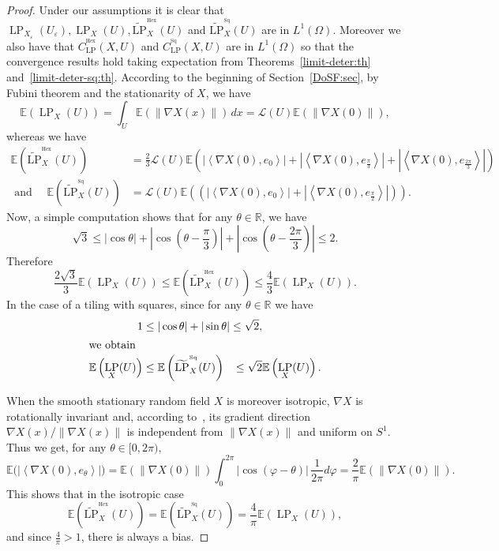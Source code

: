 \documentclass[10pt]{amsart}
\theoremstyle{definition}\newtheorem{defi}[theo]{Definition}\newtheorem{rema}[theo]{Remark}\newtheorem{exam}[theo]{Example}\newtheorem{exem}[theo]{Example}\newtheorem{nota}[theo]{Notation}
\newcommand{\R}{\mathbb{R}}
\newcommand{\E}{\mathbb{E}}
\newcommand{\eps}{\varepsilon}
\DeclareMathOperator{\LP}{LP}
\DeclareMathOperator{\Hex}{Hex}
\DeclareMathOperator{\Sq}{Sq}
\newcommand{\tLP}{\widetilde{\mathrm{LP}}}
\newcommand{\calL}{\mathcal{L}}
\begin{document}
\begin{proof}
Under our assumptions it is clear that $\LP_{X_\eps}(U_\eps), \LP_X(U), \tLP^{^{\Hex}}_{X}(U)$ and $\tLP^{^{\Sq}}_{X}(U)$ are in $L^1(\Omega)$. Moreover we also have that $C_{\LP}^{^{\Hex}}(X,U)$ and $C_{\LP}^{^{\Sq}}(X,U)$ are in $L^1(\Omega)$ so that the convergence results hold taking expectation from Theorems~\ref{limit-deter:th} and~\ref{limit-deter-sq:th}. According to the beginning of Section~\ref{DoSF:sec}, by Fubini theorem and the stationarity of $X$, we have
\[
\E\left(\LP_{X}(U)\right) = \int_U \E \left(\left\|\nabla X(x)\right\|\right) \, dx = \calL(U)
\E \left(\left\|\nabla X(0)\right\|\right),
\]
whereas we have
\begin{align*}
\E\left(\tLP^{^{\Hex}}_{X}(U)\right) &= \frac{2}{3} \calL(U) \E \left(
\left|\left\langle \nabla X(0), e_0\right\rangle\right| + \left|\left\langle \nabla X(0), e_{\frac{\pi}{3}}\right\rangle\right| +\left|\left\langle \nabla X(0),
e_{\frac{2\pi}{3}}\right\rangle\right|\right)
\\
\text{ and } \quad \E\left(\tLP^{^{\Sq}}_{X}(U)\right) &= {\calL}(U)
\E \left(\left(\left|\left\langle \nabla X(0), e_0\right\rangle\right| +\left|\left\langle \nabla
X(0), e_{\frac{\pi}{2}}\right\rangle\right|\right)\right).
\end{align*}
Now, a simple computation shows that for any $\theta\in\R$, we have
\[
\sqrt{3} \leq |\cos\theta| + \left|\cos\left(\theta-\frac{\pi}{3}\right)\right| +
\left|\cos\left(\theta-\frac{2\pi}{3}\right)\right| \leq 2.
\]
Therefore
\[
\frac{2\sqrt{3}}{3} \E\left(\LP_{X}(U)\right) \leq
\E\left(\tLP^{^{\Hex}}_{X}(U)\right) \leq \frac{4}{3} \E\left(\LP_{X}(U)\right).
\]
In the case of a tiling with squares, since for any $\theta\in\R$ we have
\begin{align*}
1 &\leq |\cos\theta| + |\sin\theta| \leq \sqrt{2},
\\
\intertext{we obtain}
\E\left(\LP_{X}(U)\right) &\leq \E\left(\tLP^{^{\Sq}}_{X}(U)\right) \quad\!\leq \sqrt{2} \E\left(\LP_{X}(U)\right).
\end{align*}


When the smooth stationary random field $X$ is moreover isotropic, $\nabla X$ is rotationally invariant and, according to~\cite[Proposition~4.10]{Bilodeau}, its gradient direction $\nabla X(x)/\| \nabla X(x)\|$ is independent from $\| \nabla X(x)\|$ and uniform on $S^1$. Thus we get, for any $\theta\in[0,2\pi)$,
\[
\E\big(\left|\left\langle \nabla X(0), e_\theta\right\rangle\right|\big) = \E\left(
\left\| \nabla X(0) \right\|\right) \int_0^{2\pi}\left|\cos\left(\varphi-\theta\right)\right| \,
\frac{1}{2\pi} d\varphi = \frac{2}{\pi} \E\left(\left\| \nabla X(0)\right\|\right)
.
\]
This shows that in the isotropic case
\[
\E\left(\tLP^{^{\Hex}}_{X}(U)\right) = \E\left(\tLP^{^{\Sq}}_{X}(U)\right) =
\frac{4}{\pi} \E\left(\LP_{X}(U)\right),
\]
and since $\frac{4}{\pi}>1$, there is always a bias.
\end{proof}
\end{document}

